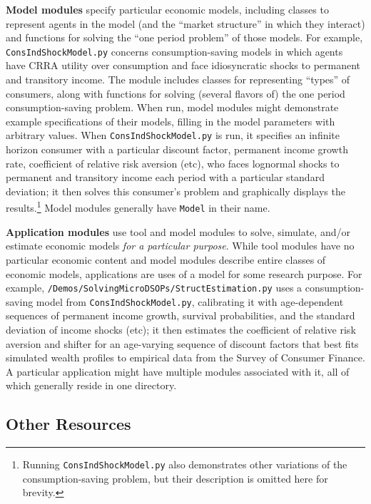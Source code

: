 \documentclass[12pt,titlepage,letterpaper]{econtex}
\begin{document}
{\textbf{Model modules} specify particular economic models, including classes to represent agents in the model (and the ``market structure'' in which they interact) and functions for solving the ``one period problem'' of those models.  For example, \texttt{ConsIndShockModel.py} concerns consumption-saving models in which agents have CRRA utility over consumption and face idiosyncratic shocks to permanent and transitory income.  The module includes classes for representing ``types'' of consumers, along with functions for solving (several flavors of) the one period consumption-saving problem.  When run, model modules might demonstrate example specifications of their models, filling in the model parameters with arbitrary values.  When \texttt{ConsIndShockModel.py} is run, it specifies an infinite horizon consumer with a particular discount factor, permanent income growth rate, coefficient of relative risk aversion (etc), who faces lognormal shocks to permanent and transitory income each period with a particular standard deviation; it then solves this consumer's problem and graphically displays the results.\footnote{Running \texttt{ConsIndShockModel.py} also demonstrates other variations of the consumption-saving problem, but their description is omitted here for brevity.}  Model modules generally have \texttt{Model} in their name.

\textbf{Application modules} use tool and model modules to solve, simulate, and/or estimate economic models \textit{for a particular purpose}.  While tool modules have no particular economic content and model modules describe entire classes of economic models, applications are uses of a model for some research purpose.  For example, \texttt{/Demos/SolvingMicroDSOPs/StructEstimation.py} uses a consumption-saving model from \texttt{ConsIndShockModel.py}, calibrating it with age-dependent sequences of permanent income growth, survival probabilities, and the standard deviation of income shocks (etc); it then estimates the coefficient of relative risk aversion and shifter for an age-varying sequence of discount factors that best fits simulated wealth profiles to empirical data from the Survey of Consumer Finance.  A particular application might have multiple modules associated with it, all of which generally reside in one directory.

\subsection{Other Resources}\label{sec:OtherResources}

}
\end{document}
